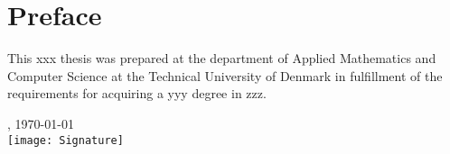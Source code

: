 \chapter{Preface}
This xxx thesis was prepared at the department of Applied Mathematics and Computer Science at the Technical University of Denmark in fulfillment of the requirements for acquiring a yyy degree in zzz.

\vfill

\begin{center}
    \thesislocation{}, \today\\[1cm]
    \hspace{3cm}\texttt{[image: Signature]}\\[1cm]
\end{center}
\begin{flushright}
    \thesisauthor{}
\end{flushright}
